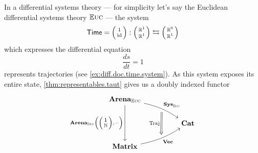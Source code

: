 \documentclass[DynamicalBook]{subfiles}
\begin{document}
\begin{example}\label{ex:trajectories.compositional.behavior}
In a differential systems theory --- for simplicity let's say the Euclidean
differential systems theory $\mathbb{E}\textsc{uc}$ --- the system
\[
\Sys{Time} = \lens{1}{\id} : \lens{\rr^1}{\rr^1} \fromto \lens{\rr^0}{\rr^1}
\]
which expresses the differential equation
$$\frac{ds}{dt} = 1$$
represents trajectories (see \cref{ex:diff.doc.time.system}). As this system
exposes its entire state, \cref{thm:representables.taut} gives us a doubly
indexed functor
\[
\begin{tikzcd}
	{\Cat{Arena}_{\eucdiff}} \\
	&& {\Cat{Cat}} \\
	{\Cat{Matrix}}
	\arrow[""{name=0, anchor=center, inner sep=0}, "{\Cat{Sys}_{\eucdiff}}", from=1-1,
  to=2-3, bend left = 10]
	\arrow[""{name=1, anchor=center, inner sep=0}, "{\Cat{Vec}}"', from=3-1,
  to=2-3, bend right = 10]
	\arrow["{\Cat{Arena}_{\determ}\left(\littlelens{\ord{1}}{\nn},-\right)}"', from=1-1, to=3-1]
	\arrow["{\Fun{Traj}}"', shorten <=4pt, shorten >=4pt, Rightarrow, from=0, to=1]
\end{tikzcd}
\]

\end{example}
\end{document}
